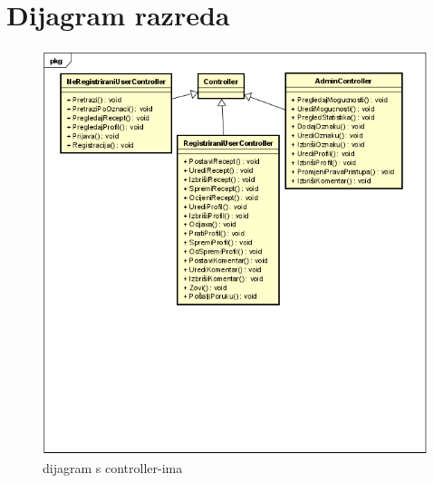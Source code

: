 		\section{Dijagram razreda}
		\begin{figure}[H]
			\includegraphics[scale=1.3]{slike/dijagram_razreda1.png} %
			\centering
			\caption{dijagram s controller-ima}
			\label{fig:Dijagram_razreda1}
		\end{figure}
